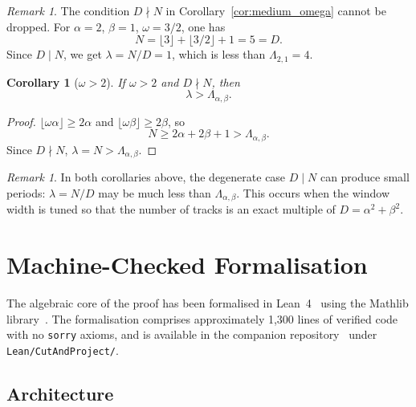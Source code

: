 \documentclass[11pt]{article}
\theoremstyle{plain}
\newtheorem{corollary}[theorem]{Corollary}
\theoremstyle{definition}
\theoremstyle{remark}
\newtheorem{remark}[theorem]{Remark}
\begin{document}
\begin{remark}
The condition \(D \nmid N\) in Corollary~\ref{cor:medium_omega} cannot be
dropped.  For \(\alpha = 2\), \(\beta = 1\), \(\omega = 3/2\), one has
\[
    N = \lfloor 3 \rfloor + \lfloor 3/2 \rfloor + 1 = 5 = D.
\]
Since \(D \mid N\), we get \(\lambda = N/D = 1\), which is less than
\(\Lambda_{2,1} = 4\).
\end{remark}

\begin{corollary}[\(\omega > 2\)]\label{cor:large_omega}
If \(\omega > 2\) and \(D \nmid N\), then
\[
    \lambda > \Lambda_{\alpha,\beta}.
\]
\end{corollary}

\begin{proof}
\(\lfloor\omega\alpha\rfloor \ge 2\alpha\) and
\(\lfloor\omega\beta\rfloor \ge 2\beta\), so
\[
    N \ge 2\alpha + 2\beta + 1 > \Lambda_{\alpha,\beta}.
\]
Since \(D \nmid N\), \(\lambda = N > \Lambda_{\alpha,\beta}\).
\end{proof}

\begin{remark}
In both corollaries above, the degenerate case \(D \mid N\) can produce
small periods: \(\lambda = N/D\) may be much less than
\(\Lambda_{\alpha,\beta}\).  This occurs when the window width is tuned so
that the number of tracks is an exact multiple of \(D = \alpha^2+\beta^2\).
\end{remark}

\section{Machine-Checked Formalisation}\label{sec:lean}

The algebraic core of the proof has been formalised in
Lean~4~\cite{Moura2021} using the Mathlib library~\cite{Mathlib2020}.
The formalisation comprises approximately 1{,}300 lines of verified code
with no \texttt{sorry} axioms, and is available in the companion
repository~\cite{Kunert2025} under \texttt{Lean/CutAndProject/}.

\subsection{Architecture}\label{subsec:lean_arch}
\end{document}
